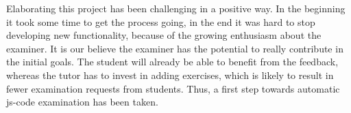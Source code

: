 Elaborating this project has been challenging in a positive way. In the beginning
it took some time to get the process going, in the end it was hard to stop developing
new functionality, because of the growing enthusiasm about the \gls{examiner}. 
It is our believe the \gls{examiner} has the potential to really contribute in
the initial goals. The student will already be able to benefit from the feedback,
whereas the tutor has to invest in adding exercises, which is likely to result in
fewer examination requests from students. Thus, a first step towards automatic 
\gls{js-code} examination has been taken.
